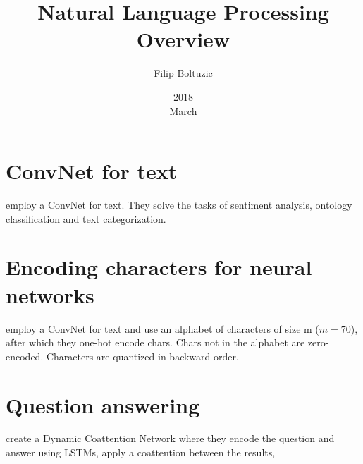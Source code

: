 \documentclass[a4paper,10pt]{article}
\title{Natural Language Processing Overview}
\author{Filip Boltuzic}
\date{2018 \\ March}
\begin{document}
\maketitle

\section{ConvNet for text}

\cite{Zhang2015} employ a ConvNet for text. They solve the tasks of
sentiment analysis, ontology classification and text
categorization. 

\section{Encoding characters for neural networks}

\cite{Zhang2015} employ a ConvNet for text and use an alphabet of 
characters of size m ($m=70$), after which they one-hot encode chars. 
Chars not in the alphabet are zero-encoded. Characters are quantized 
in backward order.

\section{Question answering}

\cite{Xiong2016} create a Dynamic Coattention Network where they encode 
the question and answer using LSTMs, apply a coattention between the results, 



\end{document}

